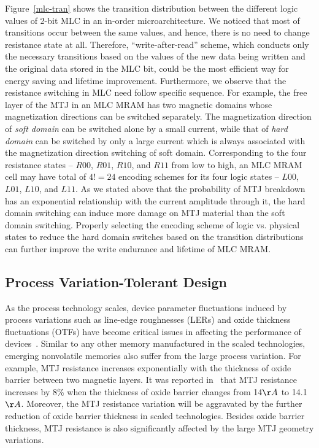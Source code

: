 Figure~\ref{mlc-tran} shows the transition distribution between the different logic values of 2-bit MLC in an in-order microarchitecture. We noticed that most of transitions occur between the same values, and hence, there is no need to change resistance state at all. Therefore, ``write-after-read'' scheme, which conducts only the necessary transitions based on the values of the new data being written and the original data stored in the MLC bit, could be the most efficient way for energy saving and lifetime improvement. Furthermore, we observe that the resistance switching in MLC need follow specific sequence. For example, the free layer of the MTJ in an MLC MRAM has two magnetic domains whose magnetization directions can be switched separately. The magnetization direction of \emph{soft domain} can be switched alone by a small current, while that of \emph{hard domain} can be switched by only a large current which is always associated with the magnetization direction switching of soft domain. Corresponding to the four resistance states -- $R00$, $R01$, $R10$, and $R11$ from low to high, an MLC MRAM cell may have total of $4! = 24$ encoding schemes for its four logic states -- $L00$, $L01$, $L10$, and $L11$. As we stated above that the probability of MTJ breakdown has an exponential relationship with the current amplitude through it, the hard domain switching can induce more damage on MTJ material than the soft domain switching. Properly selecting the encoding scheme of logic vs. physical states to reduce the hard domain switches based on the transition distributions can further improve the write endurance and lifetime of MLC MRAM.


\subsection{Process Variation-Tolerant Design}

As the process technology scales, device parameter fluctuations induced by process variations such as line-edge roughnesses (LERs) and oxide thickness fluctuations (OTFs) have become critical issues in affecting the performance of devices~\cite{Asenov03}. Similar to any other memory manufactured in the scaled technologies, emerging nonvolatile memories also suffer from the large process variation. For example, MTJ resistance increases exponentially with the thickness of oxide barrier between two magnetic layers. It was reported in~\cite{Tehrani00} that MTJ resistance increases by 8\% when the thickness of oxide barrier changes from 14${\AA}$ to 14.1${\AA}$. Moreover, the MTJ resistance variation will be aggravated by the further reduction of oxide barrier thickness in scaled technologies. Besides oxide barrier thickness, MTJ resistance is also significantly affected by the large MTJ geometry variations.

